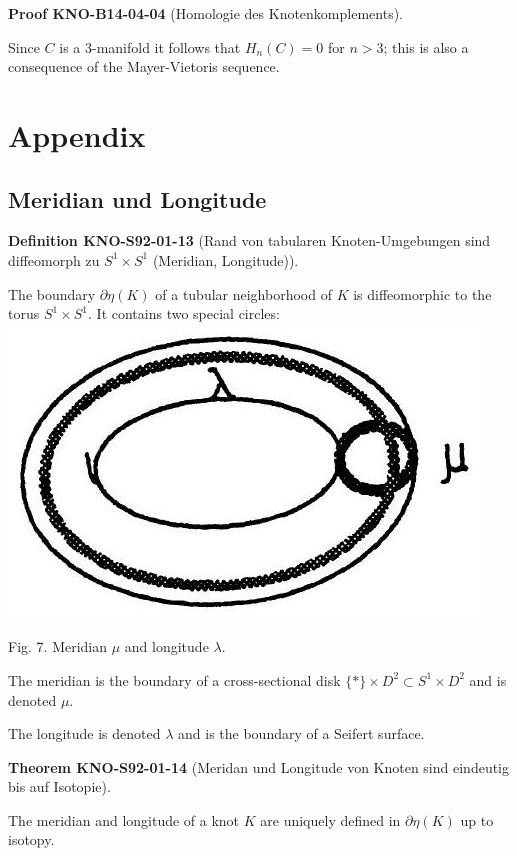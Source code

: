 \documentclass[10pt, letterpaper]{article}
\newcommand{\CustomHeading}[3]{%
  \par\medskip\noindent%
  \textbf{#1 #2} \textnormal{(#3)}.\enskip%
}
\newenvironment{DEF}[2]{\CustomHeading{Definition}{#1}{#2}}{}
\newenvironment{THEO}[2]{\CustomHeading{Theorem}{#1}{#2}}{}
\newenvironment{PROOF}[2]{\CustomHeading{Proof}{#1}{#2}}{}
\begin{document}
\begin{PROOF}{KNO-B14-04-04}{Homologie des Knotenkomplements}
Since $C$ is a 3-manifold it follows that $H_{n}(C)=0$ for $n>3$; this is also a consequence of the Mayer-Vietoris sequence.
\end{PROOF}

\section{Appendix}

\subsection{Meridian und Longitude}

\begin{DEF}{KNO-S92-01-13}{Rand von tabularen Knoten-Umgebungen sind diffeomorph zu $S^1\times S^1$ (Meridian, Longitude)}
The boundary $\partial \eta(K)$ of a tubular neighborhood of $K$ is diffeomorphic to the torus $S^{1} \times S^{1}$. It contains two special circles:\\
\includegraphics[scale=0.2, center]{2025_05_21_037de704f595ce642d3eg-080}

Fig. 7. Meridian $\mu$ and longitude $\lambda$.

The meridian is the boundary of a cross-sectional disk $\{*\} \times D^{2} \subset S^{1} \times D^{2}$ and is denoted $\mu$.

The longitude is denoted $\lambda$ and is the boundary of a Seifert surface.
\end{DEF}

\begin{THEO}{KNO-S92-01-14}{Meridan und Longitude von Knoten sind eindeutig bis auf Isotopie}
The meridian and longitude of a knot $K$ are uniquely defined in $\partial \eta(K)$ up to isotopy.
\end{THEO}
\end{document}
